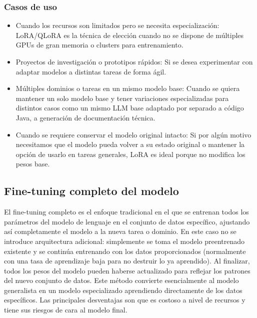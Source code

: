 \subsubsection{Casos de uso}

\begin{itemize}
    \item Cuando los recursos son limitados pero se necesita especialización: LoRA/QLoRA es la técnica de elección cuando no se dispone de múltiples GPUs de gran memoria o clusters para entrenamiento.

    \item Proyectos de investigación o prototipos rápidos: Si se desea experimentar con adaptar modelos a distintas tareas de forma ágil.

    \item Múltiples dominios o tareas en un mismo modelo base: Cuando se quiera mantener un solo modelo base y tener variaciones especializadas para distintos casos como un mismo LLM base adaptado por separado a código Java, a generación de documentación técnica.

    \item Cuando se requiere conservar el modelo original intacto: Si por algún motivo necesitamos que el modelo pueda volver a su estado original o mantener la opción de usarlo en tareas generales, LoRA es ideal porque no modifica los pesos base.
\end{itemize}

\subsection{Fine-tuning completo del modelo}

El fine-tuning completo es el enfoque tradicional en el que se entrenan todos los parámetros del modelo de lenguaje en el conjunto de datos específico, ajustando así completamente el modelo a la nueva tarea o dominio. En este caso no se introduce arquitectura adicional: simplemente se toma el modelo preentrenado existente y se continúa entrenando con los datos proporcionados (normalmente con una tasa de aprendizaje baja para no destruir lo ya aprendido). Al finalizar, todos los pesos del modelo pueden haberse actualizado para reflejar los patrones del nuevo conjunto de datos. Este método convierte esencialmente al modelo generalista en un modelo especializado aprendiendo directamente de los datos específicos. Las principales desventajas son que es costoso a nivel de recursos y tiene sus riesgos de cara al modelo final.

